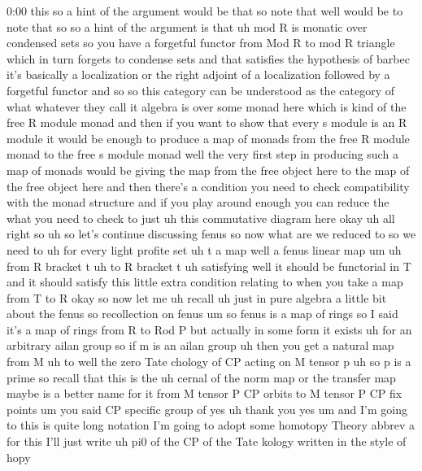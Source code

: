 \begin{unfinished}{0:00}
this  so  a  hint  of  the  argument  would  be
that
so  note  that  well  would  be  to  note  that
so  so  a  hint  of  the  argument  is  that  uh
mod  R  is
monatic  over  condensed
sets  so  you  have  a  forgetful  functor
from  Mod  R  to  mod  R  triangle  which  in
turn  forgets  to  condense  sets  and  that
satisfies  the  hypothesis  of  barbec  it's
basically  a  localization  or  the  right
adjoint  of  a  localization  followed  by  a
forgetful  functor  and  so  so  this
category  can  be  understood  as  the
category  of  what  whatever  they  call  it
algebra  is  over  some  monad  here  which  is
kind  of  the  free  R  module
monad  and  then  if  you  want  to  show  that
every  s  module  is  an  R  module  it  would
be  enough  to  produce  a  map  of  monads
from  the  free  R  module  monad  to  the  free
s  module  monad  well  the  very  first  step
in  producing  such  a  map  of  monads  would
be  giving  the  map  from  the  free  object
here  to  the  map  of  the  free  object  here
and  then  there's  a  condition  you  need  to
check  compatibility  with  the  monad
structure  and  if  you  play  around  enough
you  can  reduce  the  what  you  need  to
check  to  just  uh  this  commutative
diagram
here
okay  uh  all
right  so  uh  so  let's  continue  discussing
fenus  so  now  what  are  we  reduced  to
so  we  need
to  uh  for  every  light  profite
set
uh  t  a  map  well  a  fenus  linear
map
um  uh  from  R  bracket  t  uh  to  R  bracket  t
uh  satisfying  well  it  should  be
functorial  in  T  and  it  should  satisfy
this  little  extra  condition  relating  to
when  you  take  a  map  from  T  to
R  okay
so  now  let  me  uh  recall  uh  just  in  pure
algebra  a  little  bit  about  the  fenus  so
recollection  on
fenus
um
so  fenus  is  a  map  of  rings  so  I  said
it's  a  map  of  rings  from  R  to  Rod  P  but
actually  in  some  form  it  exists  uh  for
an  arbitrary  ailan  group  so  if  m  is  an
ailan
group  uh  then  you  get  a  natural  map  from
M  uh  to  well  the  zero  Tate  chology  of  CP
acting  on  M  tensor  p  uh  so  p  is  a
prime  so  recall  that  this  is  the  uh
cernal  of  the  norm  map  or  the  transfer
map  maybe  is  a  better  name  for  it
from  M  tensor  P  CP  orbits  to  M  tensor  P
CP  fix
points
um  you  said  CP  specific  group  of  yes  uh
thank  you
yes  um  and  I'm  going  to  this  is  quite
long  notation  I'm  going  to  adopt  some
homotopy  Theory  abbrev  a  for  this  I'll
just  write  uh  pi0  of  the  CP  of  the  Tate
kology  written  in  the  style  of  hopy

\end{unfinished}
